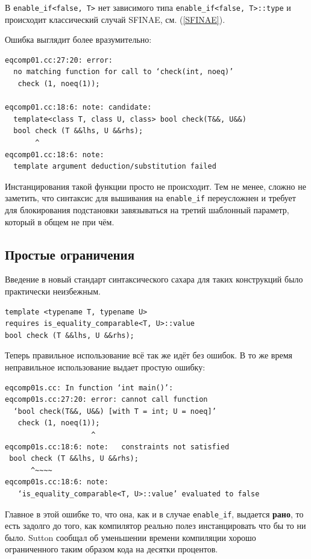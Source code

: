 \documentclass[a4paper,12pt,oneside]{book}
\begin{document}
В \lstinline!enable_if<false, T>! нет зависимого типа \lstinline!enable_if<false, T>::type! и происходит классический случай SFINAE, см. (\ref{SFINAE}).

Ошибка выглядит более вразумительно:

\begin{verbatim}
eqcomp01.cc:27:20: error: 
  no matching function for call to ‘check(int, noeq)’
   check (1, noeq(1));

eqcomp01.cc:18:6: note: candidate: 
  template<class T, class U, class> bool check(T&&, U&&)
  bool check (T &&lhs, U &&rhs);
       ^
eqcomp01.cc:18:6: note:   
  template argument deduction/substitution failed
\end{verbatim}

Инстанцирования такой функции просто не происходит. Тем не менее, сложно не заметить, что синтаксис для вышивания на \lstinline!enable_if! переусложнен и требует для блокирования подстановки завязываться на третий шаблонный параметр, который в общем не при чём.

\subsection{Простые ограничения}\label{Constraints}

Введение в новый стандарт синтаксического сахара для таких конструкций было практически неизбежным.

\begin{lstlisting}
template <typename T, typename U>
requires is_equality_comparable<T, U>::value
bool check (T &&lhs, U &&rhs);
\end{lstlisting}

Теперь правильное использование всё так же идёт без ошибок. В то же время неправильное использование выдает простую ошибку:

\begin{verbatim}
eqcomp01s.cc: In function ‘int main()’:
eqcomp01s.cc:27:20: error: cannot call function 
  ‘bool check(T&&, U&&) [with T = int; U = noeq]’
   check (1, noeq(1));
                    ^
eqcomp01s.cc:18:6: note:   constraints not satisfied
 bool check (T &&lhs, U &&rhs);
      ^~~~~
eqcomp01s.cc:18:6: note:   
   ‘is_equality_comparable<T, U>::value’ evaluated to false
\end{verbatim}

Главное в этой ошибке то, что она, как и в случае \lstinline!enable_if!, выдается \textbf{рано}, то есть задолго до того, как компилятор реально полез инстанцировать что бы то ни было. Sutton сообщал об уменьшении времени компиляции хорошо ограниченного таким образом кода на десятки процентов.
\end{document}
